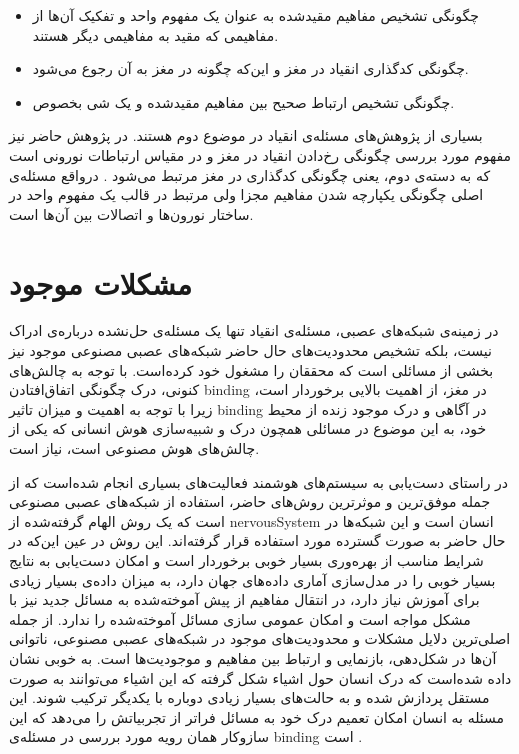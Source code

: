 \documentclass[12pt]{report}
\begin{document}
	\begin{itemize}
		\item چگونگی تشخیص مفاهیم مقید‌شده به عنوان یک مفهوم واحد  و تفکیک آن‌ها از مفاهیمی که مقید به مفاهیمی دیگر هستند.
		\item چگونگی کد‌گذاری انقیاد در مغز و این‌که چگونه در مغز به آن رجوع می‌شود.
		\item چگونگی تشخیص ارتباط صحیح بین مفاهیم  مقید‌شده و یک شی بخصوص.
	\end{itemize}

	بسیاری از پژوهش‌های مسئله‌ی انقیاد در موضوع دوم هستند. در پژوهش حاضر نیز مفهوم مورد بررسی چگونگی رخ‌دادن انقیاد در مغز و در مقیاس ارتباطات نورونی است که به دسته‌ی دوم، یعنی چگونگی کدگذاری  در مغز مرتبط می‌شود \cite{Treisman1999}. درواقع مسئله‌ی اصلی چگونگی یکپارچه شدن مفاهیم مجزا ولی مرتبط در قالب یک مفهوم واحد در ساختار نورون‌ها و اتصالات بین آن‌ها است.
	
	
	
	\section{مشکلات موجود}
	در زمینه‌ی شبکه‌های عصبی، مسئله‌ی انقیاد تنها یک مسئله‌ی حل‌نشده درباره‌ی ادراک نیست، بلکه تشخیص محدودیت‌های حال حاضر شبکه‌های عصبی مصنوعی موجود نیز بخشی از مسائلی است که محققان را مشغول خود کرده‌است.
	با توجه به چالش‌های کنونی، درک چگونگی اتفاق‌افتادن \gls{binding} در مغز، از اهمیت بالایی برخوردار است، زیرا با توجه به اهمیت و میزان تاثیر \gls{binding} در آگاهی و درک موجود زنده از محیط خود، به این موضوع در مسائلی همچون درک و شبیه‌سازی هوش انسانی که یکی از چالش‌های هوش مصنوعی است، نیاز است.
	
	در راستای دست‌یابی به سیستم‌های هوشمند فعالیت‌های بسیاری انجام شده‌است که از جمله‌ موفق‌ترین و موثر‌ترین روش‌های حاضر، استفاده از شبکه‌های عصبی مصنوعی است که یک روش الهام گرفته‌شده از \gls{nervousSystem} انسان است و این شبکه‌ها در حال حاضر به صورت گسترده مورد استفاده قرار گرفته‌اند. این روش در  عین این‌که در شرایط مناسب از بهره‌وری بسیار خوبی برخوردار است و امکان دست‌یابی به نتایج بسیار خوبی را در مدل‌سازی آماری داده‌های جهان دارد، به میزان داده‌ی بسیار زیادی برای آموزش نیاز دارد، در انتقال مفاهیم از پیش آموخته‌شده به مسائل جدید نیز با مشکل مواجه است و امکان عمومی سازی مسائل آموخته‌شده را ندارد.
	از جمله اصلی‌ترین دلایل مشکلات و محدودیت‌های موجود در شبکه‌های عصبی مصنوعی، ناتوانی آن‌ها در شکل‌دهی، بازنمایی و ارتباط بین مفاهیم و موجودیت‌ها است. به خوبی نشان داده شده‌است که درک انسان حول اشیاء شکل گرفته که این اشیاء می‌توانند به صورت مستقل پردازش شده و به حالت‌های بسیار زیادی دوباره با یکدیگر ترکیب شوند. این مسئله به انسان امکان تعمیم درک خود به مسائل فراتر از تجربیاتش را می‌دهد که این ساز‌وکار همان رویه مورد بررسی در مسئله‌ی \gls{binding} است
	\cite{greff2020binding}.
	
\end{document}
